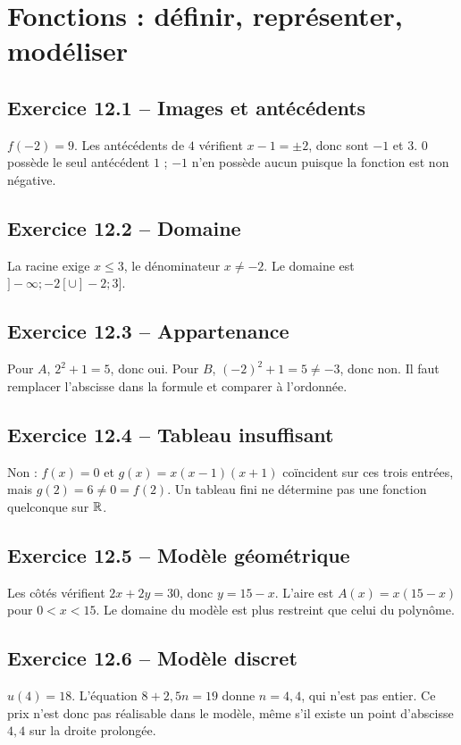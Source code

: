 \chapter{Fonctions : définir, représenter, modéliser}
\section*{Exercice 12.1 -- Images et antécédents}
$f(-2)=9$. Les antécédents de $4$ vérifient $x-1=\pm2$, donc sont $-1$ et $3$. $0$ possède le seul antécédent $1$ ; $-1$ n'en possède aucun puisque la fonction est non négative.

\section*{Exercice 12.2 -- Domaine}
La racine exige $x\leq3$, le dénominateur $x\ne-2$. Le domaine est $]-\infty;-2[\cup]-2;3]$.

\section*{Exercice 12.3 -- Appartenance}
Pour $A$, $2^2+1=5$, donc oui. Pour $B$, $(-2)^2+1=5\ne-3$, donc non. Il faut remplacer l'abscisse dans la formule et comparer à l'ordonnée.

\section*{Exercice 12.4 -- Tableau insuffisant}
Non : $f(x)=0$ et $g(x)=x(x-1)(x+1)$ coïncident sur ces trois entrées, mais $g(2)=6\ne0=f(2)$. Un tableau fini ne détermine pas une fonction quelconque sur $\mathbb{R}$.

\section*{Exercice 12.5 -- Modèle géométrique}
Les côtés vérifient $2x+2y=30$, donc $y=15-x$. L'aire est $A(x)=x(15-x)$ pour $0<x<15$. Le domaine du modèle est plus restreint que celui du polynôme.

\section*{Exercice 12.6 -- Modèle discret}
$u(4)=18$. L'équation $8+2{,}5n=19$ donne $n=4{,}4$, qui n'est pas entier. Ce prix n'est donc pas réalisable dans le modèle, même s'il existe un point d'abscisse $4{,}4$ sur la droite prolongée.
